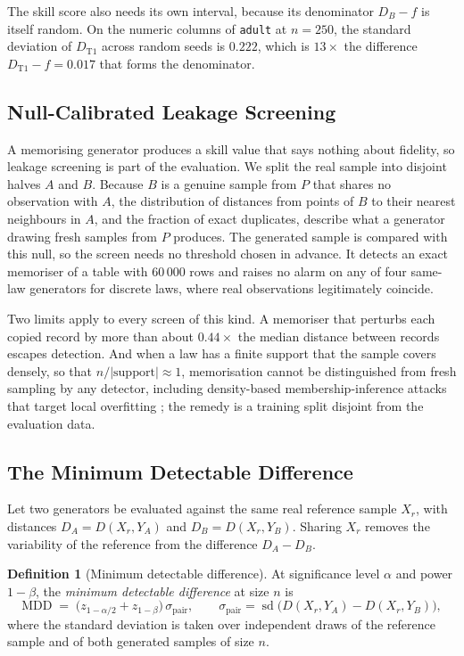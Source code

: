 \documentclass[twoside,11pt]{article}
\theoremstyle{plain}
\theoremstyle{definition}
\newtheorem{defn}{Definition}
\theoremstyle{remark}
\DeclareMathOperator{\sd}{sd}
\newcommand{\MDD}{\ensuremath{\mathrm{MDD}}}
\begin{document}
The skill score also needs its own interval, because its denominator
$D_B - f$ is itself random. On the numeric columns of \texttt{adult} at
$n = 250$, the standard deviation of $D_{\mathrm{T1}}$ across random seeds
is $0.222$, which is $13\times$ the difference $D_{\mathrm{T1}} - f = 0.017$
that forms the denominator.

\subsection{Null-Calibrated Leakage Screening}\label{sec:reporting-leakage}

A memorising generator produces a skill value that says nothing about
fidelity, so leakage screening is part of the evaluation. We split the real
sample into disjoint halves $A$ and $B$. Because $B$ is a genuine sample
from $P$ that shares no observation with $A$, the distribution of
distances from points of $B$ to their nearest neighbours in $A$, and the
fraction of exact duplicates, describe what a generator drawing fresh
samples from $P$ produces. The generated sample is compared with this null,
so the screen needs no threshold chosen in advance. It detects an exact
memoriser of a table with $60\,000$ rows and raises no alarm on any of four
same-law generators for discrete laws, where real observations
legitimately coincide.

Two limits apply to every screen of this kind. A memoriser that perturbs
each copied record by more than about $0.44\times$ the median distance
between records escapes detection. And when a law has a finite support that
the sample covers densely, so that $n/|\mathrm{support}| \approx 1$,
memorisation cannot be distinguished from fresh sampling by any detector,
including density-based membership-inference attacks that target local
overfitting \citep{vanbreugel2023}; the remedy is a training split
disjoint from the evaluation data.

\subsection{The Minimum Detectable Difference}\label{sec:reporting-mdd}

Let two generators be evaluated against the same real reference sample
$X_r$, with distances $D_A = D(X_r, Y_A)$ and $D_B = D(X_r, Y_B)$. Sharing
$X_r$ removes the variability of the reference from the difference
$D_A - D_B$.

\begin{defn}[Minimum detectable difference]\label{def:mdd}
At significance level $\alpha$ and power $1-\beta$, the \emph{minimum
detectable difference} at size $n$ is
\begin{equation}\label{eq:mdd}
  \MDD \;=\; \bigl(z_{1-\alpha/2} + z_{1-\beta}\bigr)\,
  \sigma_{\mathrm{pair}},
  \qquad
  \sigma_{\mathrm{pair}} = \sd\bigl(D(X_r, Y_A) - D(X_r, Y_B)\bigr),
\end{equation}
where the standard deviation is taken over independent draws of the
reference sample and of both generated samples of size $n$.
\end{defn}
\end{document}
